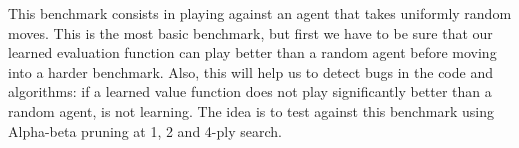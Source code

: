 This benchmark consists in playing against an agent that takes uniformly random moves. This is the most basic benchmark, but first we have to be sure that our learned evaluation function can play better than a random agent before moving into a harder benchmark. Also, this will help us to detect bugs in the code and algorithms: if a learned value function does not play significantly better than a random agent, is not learning. The idea is to test against this benchmark using Alpha-beta pruning at 1, 2 and 4-ply search.






%


